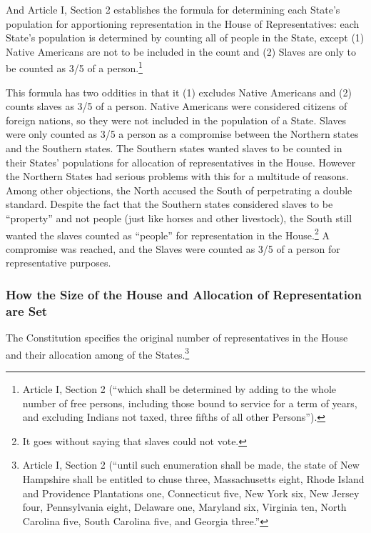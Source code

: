 And Article I, Section 2 establishes the formula for determining each State's population for apportioning representation in the House of Representatives: each State's population is determined by counting all of people in the State, except (1) Native Americans are not to be included in the count and (2) Slaves are only to be counted as 3/5 of a person.\footnote{Article I, Section 2 (``which shall be determined by adding to the whole number of free persons, including those bound to service for a term of years, and excluding Indians not taxed, three fifths of all other Persons'').}

This formula has two oddities in that it (1) excludes Native Americans and (2) counts slaves as 3/5 of a person.  Native Americans were considered citizens of foreign nations, so they were not included in the population of a State.  Slaves were only counted as 3/5 a person as a compromise between the Northern states and the Southern states.  The Southern states wanted slaves to be counted in their States' populations for allocation of representatives in the House.  However the Northern States had serious problems with this for a multitude of reasons.  Among other objections, the North accused the South of perpetrating a double standard.  Despite the fact that the Southern states considered slaves to be ``property'' and not people (just like horses and other livestock), the South still wanted the slaves counted as ``people'' for representation in the House.\footnote{It goes without saying that slaves could not vote.}  A compromise was reached, and the Slaves were counted as 3/5 of a person for representative purposes.


\subsubsection{How the Size of the House and Allocation of Representation are Set}

The Constitution specifies the original number of representatives in the House and their allocation among of the States.\footnote{Article I, Section 2 (``until such enumeration shall be made, the state of New Hampshire shall be entitled to chuse three, Massachusetts eight, Rhode Island and Providence Plantations one, Connecticut five, New York six, New Jersey four, Pennsylvania eight, Delaware one, Maryland six, Virginia ten, North Carolina five, South Carolina five, and Georgia three.''}

